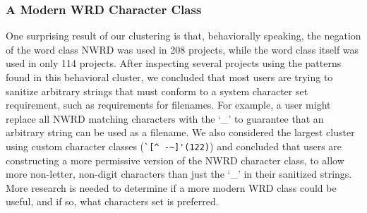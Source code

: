 \subsubsection{A Modern WRD Character Class}
One surprising result of our clustering is that, behaviorally speaking, the negation of the word class NWRD was used in 208 projects, while the word class itself was used in only 114 projects. After inspecting several projects using the patterns found in this behavioral cluster, we concluded that most users are trying to sanitize arbitrary strings that must conform to a system character set requirement, such as requirements for filenames.  For example, a user might replace all NWRD matching characters with the `\_' to guarantee that an arbitrary string can be used as a filename.  We also considered the largest cluster using custom character classes (\verb?`[^ -~]'(122)?) and concluded that users are constructing a more permissive version of the NWRD character class, to allow more non-letter, non-digit characters than just the `\_' in their sanitized strings.  More research is needed to determine if a more modern WRD class could be useful, and if so, what characters set is preferred.


